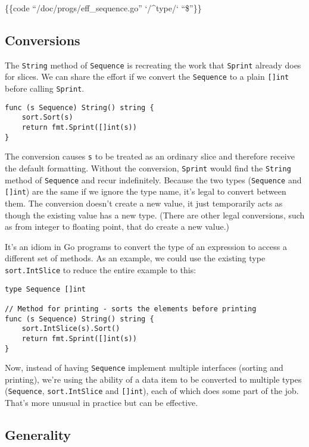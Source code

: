 \{\{code ``/doc/progs/eff\_sequence.go'' `/\^{}type/` ``\$''\}\}

\subsection*{Conversions}

The \texttt{String} method of \texttt{Sequence} is recreating the work
that \texttt{Sprint} already does for slices. We can share the effort if
we convert the \texttt{Sequence} to a plain \texttt{{[}{]}int} before
calling \texttt{Sprint}.

\begin{Verbatim}[frame=single]
func (s Sequence) String() string {
    sort.Sort(s)
    return fmt.Sprint([]int(s))
}
\end{Verbatim}

The conversion causes \texttt{s} to be treated as an ordinary slice and
therefore receive the default formatting. Without the conversion,
\texttt{Sprint} would find the \texttt{String} method of
\texttt{Sequence} and recur indefinitely. Because the two types
(\texttt{Sequence} and \texttt{{[}{]}int}) are the same if we ignore the
type name, it's legal to convert between them. The conversion doesn't
create a new value, it just temporarily acts as though the existing
value has a new type. (There are other legal conversions, such as from
integer to floating point, that do create a new value.)

It's an idiom in Go programs to convert the type of an expression to
access a different set of methods. As an example, we could use the
existing type \texttt{sort.IntSlice} to reduce the entire example to
this:

\begin{Verbatim}[frame=single]
type Sequence []int

// Method for printing - sorts the elements before printing
func (s Sequence) String() string {
    sort.IntSlice(s).Sort()
    return fmt.Sprint([]int(s))
}
\end{Verbatim}

Now, instead of having \texttt{Sequence} implement multiple interfaces
(sorting and printing), we're using the ability of a data item to be
converted to multiple types (\texttt{Sequence}, \texttt{sort.IntSlice}
and \texttt{{[}{]}int}), each of which does some part of the job. That's
more unusual in practice but can be effective.

\subsection*{Generality}

